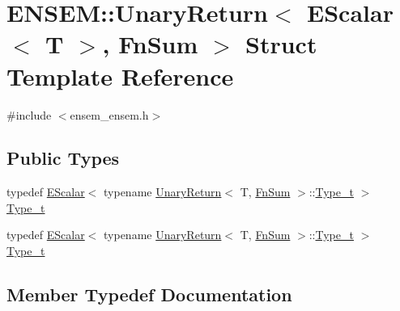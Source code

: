 \hypertarget{structENSEM_1_1UnaryReturn_3_01EScalar_3_01T_01_4_00_01FnSum_01_4}{}\section{E\+N\+S\+EM\+:\+:Unary\+Return$<$ E\+Scalar$<$ T $>$, Fn\+Sum $>$ Struct Template Reference}
\label{structENSEM_1_1UnaryReturn_3_01EScalar_3_01T_01_4_00_01FnSum_01_4}


{\ttfamily \#include $<$ensem\+\_\+ensem.\+h$>$}

\subsection*{Public Types}
\begin{DoxyCompactItemize}
\item 
typedef \mbox{\hyperlink{classENSEM_1_1EScalar}{E\+Scalar}}$<$ typename \mbox{\hyperlink{structENSEM_1_1UnaryReturn}{Unary\+Return}}$<$ T, \mbox{\hyperlink{structENSEM_1_1FnSum}{Fn\+Sum}} $>$\+::\mbox{\hyperlink{structENSEM_1_1UnaryReturn_3_01EScalar_3_01T_01_4_00_01FnSum_01_4_af4e59c889efbb46ce21a3b03bb7c9b9e}{Type\+\_\+t}} $>$ \mbox{\hyperlink{structENSEM_1_1UnaryReturn_3_01EScalar_3_01T_01_4_00_01FnSum_01_4_af4e59c889efbb46ce21a3b03bb7c9b9e}{Type\+\_\+t}}
\item 
typedef \mbox{\hyperlink{classENSEM_1_1EScalar}{E\+Scalar}}$<$ typename \mbox{\hyperlink{structENSEM_1_1UnaryReturn}{Unary\+Return}}$<$ T, \mbox{\hyperlink{structENSEM_1_1FnSum}{Fn\+Sum}} $>$\+::\mbox{\hyperlink{structENSEM_1_1UnaryReturn_3_01EScalar_3_01T_01_4_00_01FnSum_01_4_af4e59c889efbb46ce21a3b03bb7c9b9e}{Type\+\_\+t}} $>$ \mbox{\hyperlink{structENSEM_1_1UnaryReturn_3_01EScalar_3_01T_01_4_00_01FnSum_01_4_af4e59c889efbb46ce21a3b03bb7c9b9e}{Type\+\_\+t}}
\end{DoxyCompactItemize}


\subsection{Member Typedef Documentation}
\mbox{\label{structENSEM_1_1UnaryReturn_3_01EScalar_3_01T_01_4_00_01FnSum_01_4_af4e59c889efbb46ce21a3b03bb7c9b9e}} 
